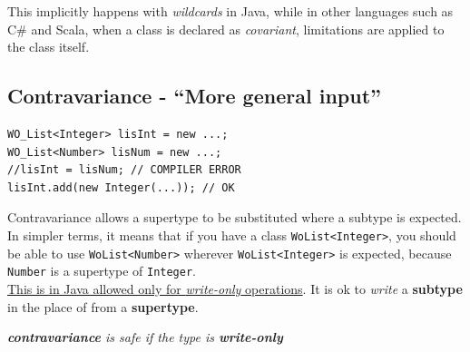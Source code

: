 This implicitly happens with \textit{wildcards} in Java, while in other languages such as C\# and Scala, when a class is declared as \textit{covariant}, limitations are applied to the class itself.

\subsection{Contravariance - ``More general input''}
\begin{lstlisting}
WO_List<Integer> lisInt = new ...;
WO_List<Number> lisNum = new ...;
//lisInt = lisNum; // COMPILER ERROR
lisInt.add(new Integer(...)); // OK
\end{lstlisting}
Contravariance allows a supertype to be substituted where a subtype is expected. In simpler terms, it means that if you have a class \lstinline|WoList<Integer>|, you should be able to use \lstinline|WoList<Number>| wherever \lstinline|WoList<Integer>| is expected, because \lstinline|Number| is a supertype of \lstinline|Integer|.\\
\ul{This is in Java allowed only for \textit{write-only} operations}.
It is ok to \textit{write} a \textbf{subtype} in the place of from a \textbf{supertype}.
\begin{center}
   \textit{\textbf{contravariance} is safe if the type is \textbf{write-only}}
\end{center}


